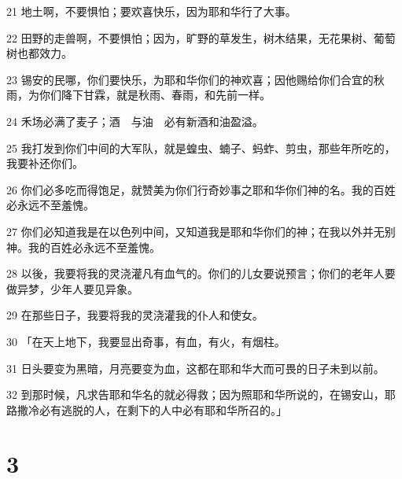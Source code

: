 \par 21 地土啊，不要惧怕；要欢喜快乐，因为耶和华行了大事。
\par 22 田野的走兽啊，不要惧怕；因为，旷野的草发生，树木结果，无花果树、葡萄树也都效力。
\par 23 锡安的民哪，你们要快乐，为耶和华你们的神欢喜；因他赐给你们合宜的秋雨，为你们降下甘霖，就是秋雨、春雨，和先前一样。
\par 24 禾场必满了麦子；酒　与油　必有新酒和油盈溢。
\par 25 我打发到你们中间的大军队，就是蝗虫、蝻子、蚂蚱、剪虫，那些年所吃的，我要补还你们。
\par 26 你们必多吃而得饱足，就赞美为你们行奇妙事之耶和华你们神的名。我的百姓必永远不至羞愧。
\par 27 你们必知道我是在以色列中间，又知道我是耶和华你们的神；在我以外并无别神。我的百姓必永远不至羞愧。
\par 28 以後，我要将我的灵浇灌凡有血气的。你们的儿女要说预言；你们的老年人要做异梦，少年人要见异象。
\par 29 在那些日子，我要将我的灵浇灌我的仆人和使女。
\par 30 「在天上地下，我要显出奇事，有血，有火，有烟柱。
\par 31 日头要变为黑暗，月亮要变为血，这都在耶和华大而可畏的日子未到以前。
\par 32 到那时候，凡求告耶和华名的就必得救；因为照耶和华所说的，在锡安山，耶路撒冷必有逃脱的人，在剩下的人中必有耶和华所召的。」

\chapter{3}

